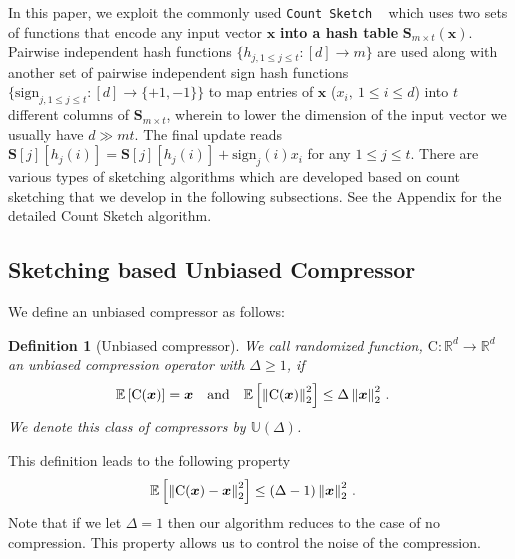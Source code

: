 \documentclass[11pt]{article}
\newtheorem{definition}{Definition}
\begin{document}
In this paper, we exploit the commonly used \texttt{Count Sketch} ~\citep{DBLP:journals/tcs/CharikarCF04} which uses two sets of functions that encode any input vector $\boldsymbol{x}$ \textbf{into a hash table} $\boldsymbol{S}_{m\times t}(\boldsymbol{x})$. 
Pairwise independent hash functions $\{h_{j,1\leq j\leq t }:[d]\rightarrow m\}$ are used along with another set of pairwise independent sign hash functions $\{\text{sign}_{j,1\leq j\leq t}: [d]\rightarrow \{+1,-1\}\}$ to map entries of $\boldsymbol{x}$ (${x}_i, \:1\leq i\leq d$) into $t$ different columns of $\mathbf{S}_{m\times t}$, wherein to lower the dimension of the input vector we usually have $d\gg mt$.  
The final update reads $\mathbf{S}[j][h_j(i)]=\mathbf{S}[j][h_{j}(i)]+\text{sign}_j(i){x}_i$ for any $1 \leq j \leq t$. There are various types of sketching algorithms which are developed based on count sketching that we develop in the following subsections. 
See the Appendix for the detailed Count Sketch algorithm. 




\vspace{-0.05in}
\subsection{Sketching based Unbiased Compressor}
\vspace{-0.05in}



We define an unbiased compressor as follows:
\begin{definition}[Unbiased compressor]\label{def:unbiased}
We call randomized function, $\text{C}:\mathbb{R}^{d}\rightarrow\mathbb{R}^{d}$ an unbiased compression operator with $\Delta\geq 1$, if
\begin{align}\notag
\mathbb{E}\left[\text{C}(\boldsymbol{x})\right]&=\boldsymbol{x}\nonumber \quad \textrm{and} \quad    \mathbb{E}\left[\left\|\text{C}(\boldsymbol{x})\right\|^2_2\right] \leq \Delta\left\|\boldsymbol{x}\right\|^2_2\notag \, .
\end{align}
We denote this class of compressors by $\mathbb{U}(\Delta)$.
\end{definition}
This definition leads to the following property 
\begin{align}\notag
    \mathbb{E}\left[\left\|\text{C}(\boldsymbol{x})-\boldsymbol{x}\right\|^2_2\right]&\leq \left(\Delta-1\right)\left\|\boldsymbol{x}\right\|^2_2\, .
\end{align}
Note that if we let $\Delta=1$ then our algorithm reduces to the case of no compression. 
This property allows us to control the noise of the compression.
\end{document}

